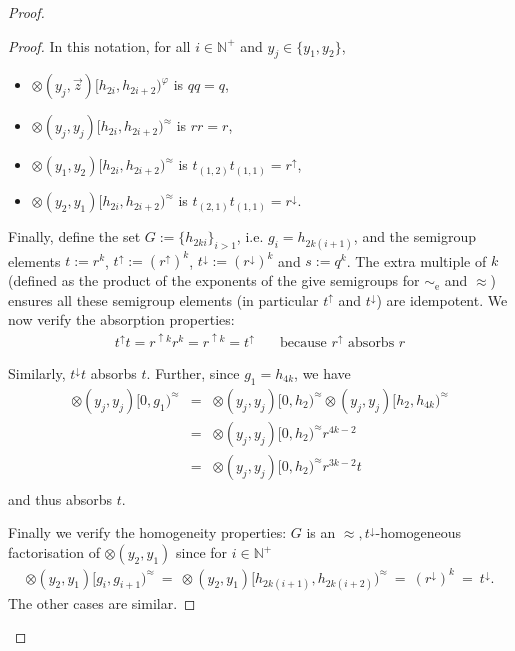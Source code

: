 \documentclass{stacs_proc}
\newcommand{\Nat}{\mathbb{N}}
\newcommand{\eqe}{\sim_{\textrm{e}}}
\begin{document}
\begin{proof}
\begin{proof}
\noindent
In this notation, for all $i \in \Nat^+$ and $y_j \in \{y_1,y_2\}$,
\begin{itemize}

\item $\otimes(y_j,\vec{z})[h_{2i},h_{2i+2})^\varphi$ is	 $q q = q$,

\item $\otimes(y_j,y_j)[h_{2i},h_{2i+2})^\approx$ is 	 $r r  = r$,

\item $\otimes(y_1,y_2)[h_{2i},h_{2i+2})^\approx$ is 	 $t_{(1,2)} t_{(1,1)}  =  r^\uparrow$,

\item $\otimes(y_2,y_1)[h_{2i},h_{2i+2})^\approx$ is 	 $t_{(2,1)} t_{(1,1)}  =  r^\downarrow$.\\

\end{itemize}



Finally, define the set $G:=\{h_{2ki}\}_{i > 1}$, i.e. $g_i = h_{2k(i+1)}$, 
and the semigroup elements $t:= r^k$, $t^\uparrow := (r^\uparrow)^k$, 
$t^\downarrow := (r^\downarrow)^k$ and $s:= q^k$. 
The extra multiple of $k$ (defined as the product of the exponents of the give
semigroups for $\eqe$ and $\approx$) ensures all these semigroup elements (in
particular $t^\uparrow$ and $t^\downarrow$) are idempotent.
We now verify the absorption properties:
\begin{eqnarray*}
  t^\uparrow t = r^{\uparrow k} r^k = r^{\uparrow k} = t^{\uparrow} & 
    \quad \text{because } r^{\uparrow} \text{ absorbs } r 
\end{eqnarray*}


Similarly, $t^\downarrow t$ absorbs $t$. Further, since $g_1 = h_{4k}$, we have 
\begin{eqnarray*}
\otimes(y_j,y_j)[0,g_1)^{\approx} 
		& = & \otimes(y_j,y_j)[0,h_2)^{\approx} \otimes(y_j,y_j)[h_2,h_{4k})^\approx\\
		& = & \otimes(y_j,y_j)[0,h_2)^{\approx} r^{4k-2}\\
		& = & \otimes(y_j,y_j)[0,h_2)^{\approx} r^{3k-2}t\\
\end{eqnarray*}
and thus absorbs $t$. 

Finally we verify the homogeneity properties:
$G$ is an $\approx,t^\downarrow$-homogeneous factorisation of $\otimes(y_2,y_1)$ since for $i \in \Nat^+$
\begin{eqnarray*}
  \otimes(y_2,y_1)[g_i,g_{i+1})^\approx 	
      \ = \  \otimes(y_2,y_1)[h_{2k(i+1)},h_{2k(i+2)})^\approx  
      \ = \  (r^\downarrow)^k 
      \ = \  t^\downarrow.
\end{eqnarray*}
The other cases are similar.
\end{proof}



\end{proof}
\end{document}

